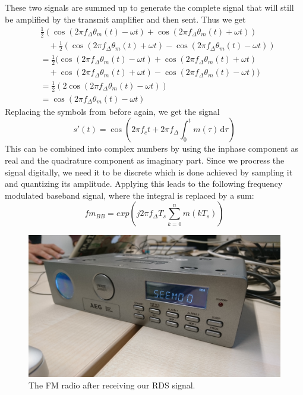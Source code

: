 \documentclass[sigconf]{acmart}
\begin{document}
These two signals are summed up to generate the complete signal that will still be amplified by the 
transmit amplifier and then sent. Thus we get 
\begin{align*}
&\frac{1}{2}(\cos (2 \pi f_\Delta \theta_m (t) - \omega t) + \cos (2 \pi f_\Delta \theta_m (t)+ \omega t))\\
&\hspace{1em}+ \frac{1}{2}(\cos (2 \pi f_\Delta \theta_m (t) + \omega t) - \cos (2 \pi f_\Delta \theta_m (t) - \omega t))\\
&= \frac{1}{2}(\cos (2 \pi f_\Delta \theta_m (t) - \omega t) + \cos (2 \pi f_\Delta \theta_m (t)+ \omega t)\\
&\hspace{1em}+ \cos (2 \pi f_\Delta \theta_m (t) + \omega t) - \cos (2 \pi f_\Delta \theta_m (t) - \omega t))\\
&= \frac{1}{2}(2 \cos (2 \pi f_\Delta \theta_m (t) - \omega t))\\
&= \cos (2 \pi f_\Delta \theta_m (t) - \omega t)
\end{align*}
Replacing the symbols from before again, we get the signal
\[
s'(t) = \cos (2 \pi f_c t + 2 \pi f_\Delta \int_0^t m(\tau)\,\mathrm{d}\tau)
\]
This can be combined into complex numbers by using the inphase component as real and the quadrature
component as imaginary part. Since we procress the signal digitally, we need it to be discrete which is
done achieved by sampling it and quantizing its amplitude. Applying this leads to the following frequency
modulated baseband signal, where the integral is replaced by a sum:
\[
fm_{BB} = exp(j2\pi f_\Delta T_s \sum_{k=0}^n m(kT_s))
\]

\begin{figure}[tb!]
	\includegraphics[width=1\linewidth]{radio_display.png}
	\caption{The FM radio after receiving our RDS signal.}
	\label{fig:rds_filt_plot}
\end{figure}
\end{document}
